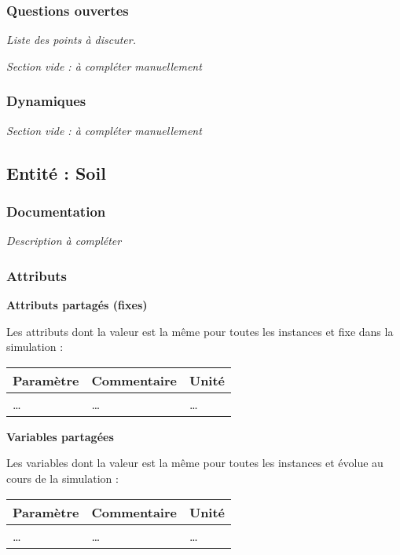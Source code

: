 \documentclass[
]{article}
\begin{document}
\subsubsection{Questions ouvertes}\label{questions-ouvertes-10}

\emph{Liste des points à discuter.}

\emph{Section vide : à compléter manuellement}

\subsubsection{Dynamiques}\label{dynamiques-10}

\emph{Section vide : à compléter manuellement}

\subsection{Entité : Soil}\label{entituxe9-soil}

\subsubsection{Documentation}\label{documentation-15}

\emph{Description à compléter}

\subsubsection{Attributs}\label{attributs-15}

\textbf{Attributs partagés (fixes)}

Les attributs dont la valeur est la même pour toutes les instances et
fixe dans la simulation :

\begin{longtable}[]{@{}lll@{}}
\toprule\noalign{}
\textbf{Paramètre} & \textbf{Commentaire} & \textbf{Unité} \\
\midrule\noalign{}
\endhead
\bottomrule\noalign{}
\endlastfoot
\ldots{} & \ldots{} & \ldots{} \\
\end{longtable}

\textbf{Variables partagées}

Les variables dont la valeur est la même pour toutes les instances et
évolue au cours de la simulation :

\begin{longtable}[]{@{}lll@{}}
\toprule\noalign{}
\textbf{Paramètre} & \textbf{Commentaire} & \textbf{Unité} \\
\midrule\noalign{}
\endhead
\bottomrule\noalign{}
\endlastfoot
\ldots{} & \ldots{} & \ldots{} \\
\end{longtable}
\end{document}
